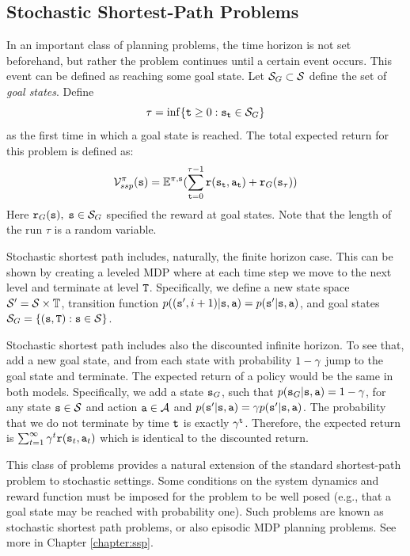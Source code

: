 \subsection{Stochastic Shortest-Path Problems}
In an important class of planning problems, the time horizon is not
set beforehand, but rather the problem continues until a certain
event occurs. This event can be defined as reaching some goal state.
Let  ${\mathcal{S}_G} \subset \mathcal{S}$ define the set of \emph{goal
states}. Define
\[\tau  = \inf \{ {\tt t} \ge 0:{{\tt s}_{\tt t}} \in {\mathcal{S}_G}\} \]
as the first time in which a goal state is reached. The total expected return for this problem is defined as:
\[\mathcal{V}_{ssp}^\pi ({\tt s}) = {\mathbb{E}^{\pi ,{\tt s}}}(\sum\limits_{{\tt t} = 0}^{\tau  - 1} {{\tt r}({{\tt s}_{\tt t}},{{\tt a}_{\tt t}})}  + {{\tt r}_G}({{\tt s}_\tau }))\]
Here ${{\tt r}_G}({\tt s}),\;{\tt s} \in {\mathcal{S}_G}$ specified the
reward at goal states. Note that the length of the run $\tau$ is a random variable.



Stochastic shortest path includes, naturally, the finite horizon case. This can be shown by creating a leveled MDP where at each time step we move to the next level and terminate at level ${\tt T}$.
Specifically, we define a new state space $\mathcal{S}'=\mathcal{S}\times \mathbb{T}$, transition function $p(({\tt s}',i+1)|{\tt s},{\tt a})=p({\tt s}'|{\tt s},{\tt a})$, and goal states $\mathcal{S}_G=\{({\tt s},{\tt T}):{\tt s} \in\mathcal{S}\}$.

Stochastic shortest path includes also the discounted infinite
horizon. To see that, add a new goal state, and from each state with
probability $1-\gamma$ jump to the goal state and terminate. The
expected return of a policy would be the same in both models.
Specifically, we add a state ${\tt s}_G$, such that
$p({\tt s}_G|{\tt s},{\tt a})=1-\gamma$, for any state
${\tt s}\in\mathcal{S}$ and action ${\tt a}\in\mathcal{A}$ and
$p({\tt s}'|{\tt s},{\tt a})=\gamma p({\tt s}'|{\tt s},{\tt a})$. The
probability that we do not terminate by time ${\tt t}$ is exactly
$\gamma^{\tt t}$. Therefore, the expected return is
$\sum_{t=1}^\infty \gamma^t{\tt r}({\tt s}_t,{\tt a}_t)$ which is
identical to the discounted return.

This class of problems provides a natural extension of the standard
shortest-path problem to stochastic settings.  Some conditions on
the system dynamics and reward function must be imposed for the
problem to be well posed (e.g., that a goal state may be reached
with probability one). Such problems are known as stochastic
shortest path problems, or also episodic MDP planning problems. See
more in Chapter \ref{chapter:ssp}.

